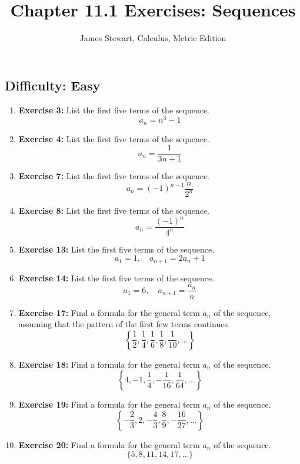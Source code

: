 \documentclass[12pt, a4paper]{article}
\title{Chapter 11.1 Exercises: Sequences}
\author{James Stewart, Calculus, Metric Edition}
\date{}
\begin{document}
\maketitle
\hrulefill
\vspace{1em}

\subsection*{Difficulty: Easy}
\begin{enumerate}
    \item \textbf{Exercise 3:} List the first five terms of the sequence.
    \[ a_n = n^3 - 1 \]

    \item \textbf{Exercise 4:} List the first five terms of the sequence.
    \[ a_n = \frac{1}{3n + 1} \]
    
    \item \textbf{Exercise 7:} List the first five terms of the sequence.
    \[ a_n = (-1)^{n-1} \frac{n}{2^n} \]
    
    \item \textbf{Exercise 8:} List the first five terms of the sequence.
    \[ a_n = \frac{(-1)^n}{4^n} \]

    \item \textbf{Exercise 13:} List the first five terms of the sequence.
    \[ a_1 = 1, \quad a_{n+1} = 2a_n + 1 \]
    
    \item \textbf{Exercise 14:} List the first five terms of the sequence.
    \[ a_1 = 6, \quad a_{n+1} = \frac{a_n}{n} \]

    \item \textbf{Exercise 17:} Find a formula for the general term $a_n$ of the sequence, assuming that the pattern of the first few terms continues.
    \[ \left\{ \frac{1}{2}, \frac{1}{4}, \frac{1}{6}, \frac{1}{8}, \frac{1}{10}, \dots \right\} \]
    
    \item \textbf{Exercise 18:} Find a formula for the general term $a_n$ of the sequence.
    \[ \left\{ 4, -1, \frac{1}{4}, -\frac{1}{16}, \frac{1}{64}, \dots \right\} \]

    \item \textbf{Exercise 19:} Find a formula for the general term $a_n$ of the sequence.
    \[ \left\{ -\frac{2}{3}, 2, -\frac{4}{3}, \frac{8}{9}, -\frac{16}{27}, \dots \right\} \]

    \item \textbf{Exercise 20:} Find a formula for the general term $a_n$ of the sequence.
    \[ \{ 5, 8, 11, 14, 17, \dots \} \]
\end{enumerate}
\end{document}
